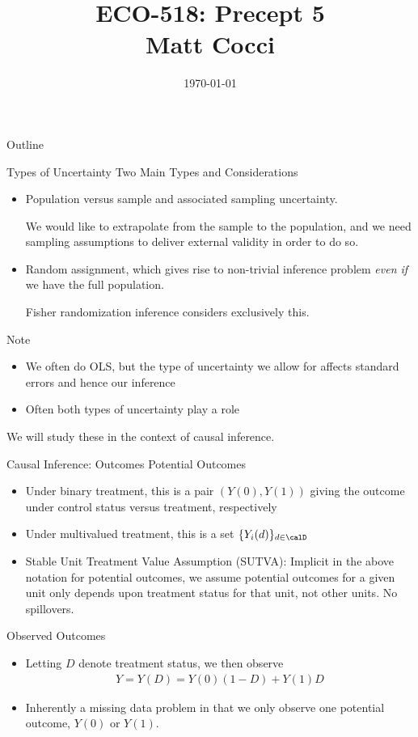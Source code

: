 \documentclass[aspectratio=169, handout]{beamer}
\title[]{ECO-518: Precept 5 \\ Matt Cocci}
\author[]{}
\date{\today}
\begin{document}
\begin{frame}[plain]
\titlepage
\end{frame}


\begin{frame}{Outline}
\tableofcontents[hideallsubsections]
\end{frame}


{\footnotesize
\begin{frame}{Types of Uncertainty}
Two Main Types and Considerations
\begin{itemize}
  \item Population versus sample and associated
    \alert{sampling uncertainty}.

    We would like to extrapolate from the sample to the population,
    and we need \alert{sampling assumptions} to deliver external
    validity in order to do so.

  \item \alert{Random assignment}, which gives rise to non-trivial
    inference problem \emph{even if} we have the full population.

    Fisher randomization inference considers exclusively this.
\end{itemize}
Note
\begin{itemize}
  \item We often do OLS, but the type of uncertainty we allow for
    affects \alert{standard errors} and hence our inference
  \item Often both types of uncertainty play a role
\end{itemize}
We will study these in the context of causal inference.
\end{frame}
}



{\footnotesize
\begin{frame}{Causal Inference: Outcomes}
\alert{Potential Outcomes}
\begin{itemize}
  \item Under binary treatment, this is a pair $(Y(0),Y(1))$
    giving the outcome under control status versus treatment,
    respectively
  \item Under multivalued treatment, this is a set
    $\{Y_i(d)\}_{d\in \calD}$
  \item \alert{Stable Unit Treatment Value Assumption (SUTVA)}:
    Implicit in the above notation for potential outcomes, we assume
    potential outcomes for a given unit only depends upon treatment status
    \alert{for that unit}, not other units.
    No spillovers.
\end{itemize}
\alert{Observed Outcomes}
\begin{itemize}
  \item Letting $D$ denote treatment status, we then observe
    \begin{align*}
      Y
      = Y(D)
      =
      Y(0)(1-D)
      +
      Y(1)D
    \end{align*}
  \item Inherently a \alert{missing data problem} in that we only
    observe one potential outcome, $Y(0)$ or $Y(1)$.
\end{itemize}
\end{frame}
}
\end{document}
